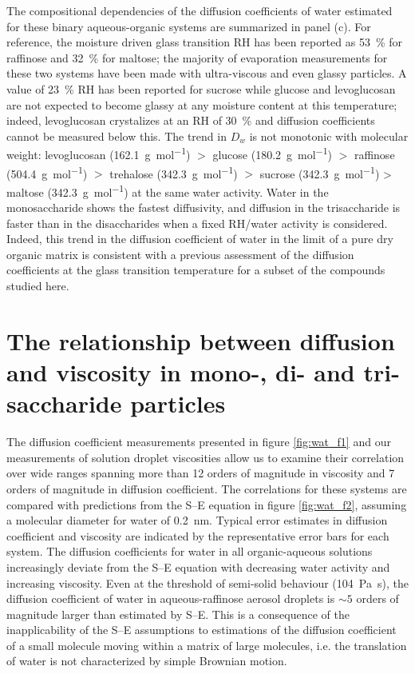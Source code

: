 The compositional dependencies of the diffusion coefficients of water estimated for these binary aqueous-organic systems are summarized in panel (c). For reference, the moisture driven glass transition RH has been reported as \SI{53}{\percent} for raffinose\cite{Song2016a,Tong2011} and \SI{32}{\percent} for maltose\cite{Song2016a}; the majority of evaporation measurements for these two systems have been made with ultra-viscous and even glassy particles. A value of \SI{23}{\percent} RH has been reported for sucrose\cite{Song2016a,Tong2011} while glucose and levoglucosan are not expected to become glassy at any moisture content at this temperature\cite{Zobrist2008}; indeed, levoglucosan crystalizes at an RH of \SI{30}{\percent} and diffusion coefficients cannot be measured below this. The trend in $D_{w}$ is not monotonic with molecular weight: levoglucosan (\SI{162.1}{\gram\per\mol}) $>$ glucose (\SI{180.2}{\gram\per\mol}) $>$ raffinose (\SI{504.4}{\gram\per\mole}) $>$ trehalose (\SI{342.3}{\gram\per\mole}) $>$ sucrose (\SI{342.3}{\gram\per\mol}) > maltose (\SI{342.3}{\gram\per\mole}) at the same water activity. Water in the monosaccharide shows the fastest diffusivity, and diffusion in the trisaccharide is faster than in the disaccharides when a fixed RH/water activity is considered. Indeed, this trend in the diffusion coefficient of water in the limit of a pure dry organic matrix is consistent with a previous assessment of the diffusion coefficients at the glass transition temperature for a subset of the compounds studied here\cite{lienhard2015viscous}.

\section{The relationship between diffusion and viscosity in mono-, di- and tri-saccharide particles}\label{sec:wat_d_eta}

The diffusion coefficient measurements presented in figure \ref{fig:wat_f1} and our measurements of solution droplet viscosities\cite{Song2016a} allow us to examine their correlation over wide ranges spanning more than \num{12} orders of magnitude in viscosity and \num{7} orders of magnitude in diffusion coefficient. The correlations for these systems are compared with predictions from the S–E equation in figure \ref{fig:wat_f2}, assuming a molecular diameter for water of \SI{0.2}{\nano\meter}. Typical error estimates in diffusion coefficient and viscosity are indicated by the representative error bars for each system. The diffusion coefficients for water in all organic-aqueous solutions increasingly deviate from the S–E equation with decreasing water activity and increasing viscosity. Even at the threshold of semi-solid behaviour (\SI{104}{\pascal\second}), the diffusion coefficient of water in aqueous-raffinose aerosol droplets is $\sim \num{5}$ orders of magnitude larger than estimated by S–E. This is a consequence of the inapplicability of the S–E assumptions to estimations of the diffusion coefficient of a small molecule moving within a matrix of large molecules, i.e. the translation of water is not characterized by simple Brownian motion\cite{Chen2006a,Liu2015}.

